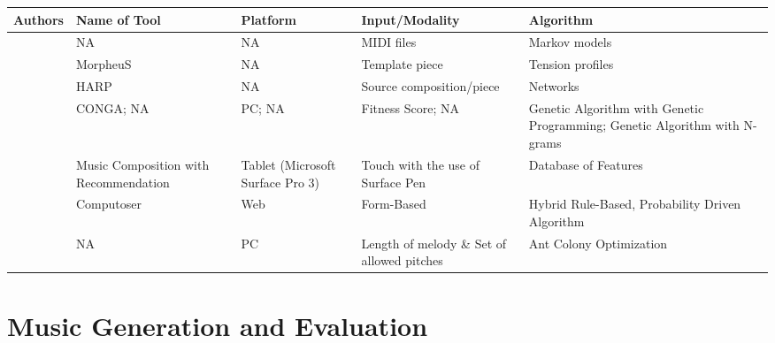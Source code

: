 \begin{landscape} %
\begin{table} [!htbp]  
\label{tab:rsomcrtas}        
   \vspace{0.20cm}    
        \begin{tabular}{|p{3cm}|p{4cm}|p{3cm}| p{3cm} | p{3cm}| } %
        \hline 
       Authors & Name of Tool & Platform & Input/Modality & Algorithm \\ \hline
       
       \citet{ames1989markov,eigenfeldt2010realtime} & NA & NA & MIDI files & Markov models \\ \hline
      
       \citet{herremans2016morpheus} & MorpheuS & NA & Template piece & Tension profiles \\ \hline
       
       \citet{camurri1991harp} & HARP & NA & Source composition/piece & Networks\\ \hline
       
       \citet{tokui2000music, kikuchi2014automatic} & CONGA; NA & PC; NA & Fitness Score; NA & Genetic Algorithm with Genetic Programming; Genetic Algorithm with N-grams\\
        \hline
        
        \citet{kikuchi2016music} & Music Composition with Recommendation & Tablet (Microsoft Surface Pro 3) & Touch with the use of Surface Pen & Database of Features \\ \hline
        
        \citet{bozhanov2014computoser} & Computoser & Web & Form-Based & Hybrid Rule-Based, Probability Driven Algorithm \\
        \hline
        
        \citet{geis2008creating} & NA & PC & Length of melody \& Set of allowed pitches & Ant Colony Optimization \\
        \hline
      
        \end{tabular}
\end{table}
\end{landscape}

\section{Music Generation and Evaluation}

